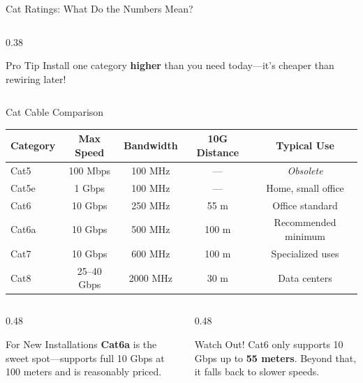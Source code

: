 \documentclass[aspectratio=169]{beamer}  %
\begin{document}
\begin{frame}[t,shrink=10]{Cat Ratings: What Do the Numbers Mean?}
\begin{columns}[T]
\begin{column}{0.38\textwidth}
            \vspace{0.3em}
            \begin{alertblock}{Pro Tip}
                Install one category \textbf{higher} than you need today---it's cheaper than rewiring later!
            \end{alertblock}
        \end{column}
    \end{columns}
\end{frame}

\begin{frame}[t,shrink=12]{Cat Cable Comparison}
    \begin{center}
        \scriptsize
        \begin{tabular}{l c c c c}
            \toprule
            \textbf{Category} & \textbf{Max Speed} & \textbf{Bandwidth} & \textbf{10G Distance} & \textbf{Typical Use} \\
            \midrule
            Cat5 & 100 Mbps & 100 MHz & --- & \textit{Obsolete} \\
            \rowcolor{rctcblue!10}
            Cat5e & 1 Gbps & 100 MHz & --- & Home, small office \\
            \rowcolor{rctcblue!10}
            Cat6 & 10 Gbps & 250 MHz & 55 m & Office standard \\
            \rowcolor{networkgreen!15}
            Cat6a & 10 Gbps & 500 MHz & 100 m & Recommended minimum \\
            Cat7 & 10 Gbps & 600 MHz & 100 m & Specialized uses \\
            Cat8 & 25--40 Gbps & 2000 MHz & 30 m & Data centers \\
            \bottomrule
        \end{tabular}
    \end{center}
    
    \vspace{0.5em}
    \begin{columns}[T]
        \begin{column}{0.48\textwidth}
            \begin{block}{For New Installations}
                \textbf{Cat6a} is the sweet spot---supports full 10 Gbps at 100 meters and is reasonably priced.
            \end{block}
        \end{column}
        \begin{column}{0.48\textwidth}
            \begin{alertblock}{Watch Out!}
                Cat6 only supports 10 Gbps up to \textbf{55 meters}. Beyond that, it falls back to slower speeds.
            \end{alertblock}
        \end{column}
    \end{columns}
    

\end{frame}
\end{document}
